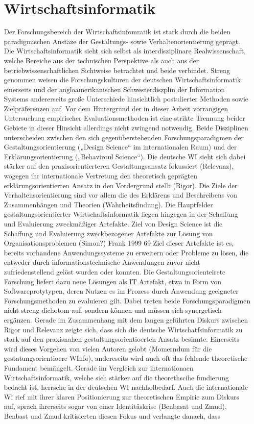 \section{Wirtschaftsinformatik}

Der Forschungsbereich der Wirtschaftsinfomratik ist stark durch die beiden paradigmischen Anstäze der Gestaltungs- sowie Verhaltenorientierung geprägt. 
Die Wirtschaftsinformatik sieht sich selbst als interdisziplinare Realwissenschaft, welche Bereiche aus der technischen Perspektive als auch aus der betriebwissenschaftlichen Sichtweise betrachtet und beide verbindet.
Streng genommen weisen die Forschungskulturen der deutschen Wirtschaftsinformatik einerseits und der angloamerikanischen Schwesterdiszplin der Information Systems andererseits große Unterschiede hinsichtlich postulierter Methoden sowie Zielpräferenzen auf. Vor dem Hintergrund der in dieser Arbeit vorrangigen Untersuchung empirischer Evaluationsmethoden ist eine strikte Trennung beider Gebiete in dieser Hinsicht allerdings nicht zwingend notwendig.  Beide Disziplinen unterscheiden zwischen den sich gegenüberstehenden Forschungsparadigmen der Gestaltungsorientierung („Design Science“ im internationalen Raum) und der Erklärungsorientierung („Behaviroul Science“). Die deutsche WI sieht sich dabei stärker auf den praxisorientierteren Gestaltungsansatz fokussiert (Relevanz), wogegen ihr internationale Vertretung den theoretisch geprägten erklärungsorientierten Ansatz in den Vordergrund stellt (Rigor).  Die Ziele der Verhaltensorientierung sind vor allem die des Erklärens und Beschreibens von Zusammenhängen und Theorien (Wahrheitsfindung). Die Hauptfelder gestaltungsorientierter Wirtschaftsinformatik liegen hingegen in der Schaffung und Evaluierung zweckmäßiger Artefakte. Ziel von Design Science ist die Schaffung und Evaluierung zweckbezogener Artefakte zur Lösung von Organisationsproblemen (Simon?) {Frank 1999 69} Ziel dieser Artefakte ist es, bereits vorhandene Anwendungssysteme zu erweitern oder Probleme zu lösen, die entweder durch informationstechnische Anwendungen zuvor nicht zufriedenstellend gelöst wurden oder konnten. Die Gestaltungsorienteirete Forschung liefert dazu neue Lösungen als IT Artefakt, etwa in Form von Softwareprotytypen, deren Nutzen es im Prozess durch Anwendung geeigneter Forschungsmethoden zu evaluieren gilt. Dabei treten beide Forschungsparadigmen nicht streng dichotom auf, sondern können und müssen sich synergetisch ergänzen. Gerade im Zusammenhang mit dem langen geführten Diskurs zwischen Rigor und Relevanz zeigte sich, dass sich die deutsche Wirtschatfsinformatik zu stark auf den  \label{test}praxisnahen gestaltungsorientioerten Ansatz besinnte. Einerseits wird dieses Vorgehen von vielen Autoren gelobt (Momerndum für die gestatungsorientioere WInfo), andereseits wird auch oft das fehlende theoretische Fundament bemängelt. Gerade im Vergleich zur internationaen Wirtschaftsinformatik, welche sich stärker auf die theorethscihe fundierung bedacht ist, herrsche in der deutschen WI nachholbedarf. Auch die internationale Wi rief mit ihrer klaren Positionierung zur theoretischen Empirie zum Diskurs auf, sprach ihrerseits sogar von einer Identitäskrise (Benbasat und Zmud). Benbast und Zmud kritisierten diesen Fokus und verlangte danach, dass 